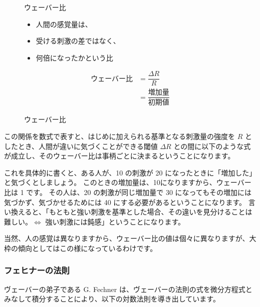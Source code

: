 \documentclass[uplatex,dvipdfmx,a4paper,11pt]{jsreport}
\begin{document}
\begin{figure}[htb]
	\begin{center}
		\begin{minipage}{0.45\textwidth}
			\large
			\begin{itembox}[l]{ウェーバー比}
				\begin{itemize}
					\item 人間の感覚量は、
					\item 受ける刺激の差ではなく、
					\item 何倍になったかという比
				\end{itemize}
			\end{itembox}
		\end{minipage}
		\begin{minipage}{0.45\textwidth}
			\large
			\begin{align*}
				\text{ウェーバー比} &= \dfrac{\Delta R}{R} \\
				&= \dfrac{\text{増加量}}{\text{初期値}}
			\end{align*}
		\end{minipage}
		\caption{ウェーバー比}
		\label{fig:weber}
	\end{center}
\end{figure}

この関係を数式で表すと、はじめに加えられる基準となる刺激量の強度を $R$ としたとき、人間が違いに気づくことができる閾値 $\Delta R$ との間に以下のような式が成立し、そのウェーバー比は事柄ごとに決まるということになります。

これを具体的に書くと、ある人が、10 の刺激が 20 になったときに「増加した」と気づくとしましょう。
このときの増加量は、10になりますから、ウェーバー比は 1 です。
その人は、20 の刺激が同じ増加量で 30 になってもその増加には気づかず、気づかせるためには 40 にする必要があるということになります。
言い換えると、「もともと強い刺激を基準とした場合、その違いを見分けることは難しい。$\Leftrightarrow$ 強い刺激には鈍感」ということになります。

当然、人の感覚は異なりますから、ウェーバー比の値は個々に異なりますが、大枠の傾向としてはこの様になっているわけです。

\subsubsection{フェヒナーの法則}

ヴェーバーの弟子である G. Fechner は、ヴェーバーの法則の式を微分方程式とみなして積分することにより、以下の対数法則を導き出しています。
\end{document}
